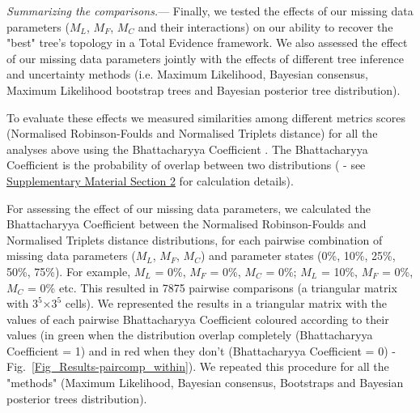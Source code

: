 \documentclass[12pt,letterpaper]{article}
\renewcommand{\subsubsection}[1]{%
\vspace{2ex}
\noindent
\textit{#1.}---}
\begin{document}
\subsubsection{Summarizing the comparisons}
Finally, we tested the effects of our missing data parameters ($M_{L}$, $M_{F}$, $M_{C}$ and their interactions) on our ability to recover the "best" tree's topology in a Total Evidence framework. We also assessed the effect of our missing data parameters jointly with the effects of different tree inference and uncertainty methods (i.e. Maximum Likelihood, Bayesian consensus, Maximum Likelihood bootstrap trees and Bayesian posterior tree distribution).

To evaluate these effects we measured similarities among different metrics scores (Normalised Robinson-Foulds and Normalised Triplets distance) for all the analyses above using the Bhattacharyya Coefficient \citep{Bhattacharyya}. The Bhattacharyya Coefficient is the probability of overlap between two distributions (\citealt{Bhattacharyya} - see \hyperref[SupplementaryMaterial]{Supplementary Material Section 2} for calculation details).

For assessing the effect of our missing data parameters, we calculated the Bhattacharyya Coefficient between the Normalised Robinson-Foulds and Normalised Triplets distance distributions, for each pairwise combination of missing data parameters ($M_{L}$, $M_{F}$, $M_{C}$) and parameter states (0\%, 10\%, 25\%, 50\%, 75\%). For example, $M_{L}$ = 0\%, $M_{F}$ = 0\%, $M_{C}$ = 0\%; $M_{L}$ = 10\%, $M_{F}$ = 0\%, $M_{C}$ = 0\% etc. This resulted in 7875 pairwise comparisons (a triangular matrix with $3^5$$\times$$3^5$ cells). We represented the results in a triangular matrix with the values of each pairwise Bhattacharyya Coefficient coloured according to their values (in green when the distribution overlap completely (Bhattacharyya Coefficient = 1) and in red when they don't (Bhattacharyya Coefficient = 0) - Fig.~\ref{Fig_Results-paircomp_within}). We repeated this procedure for all the "methods" (Maximum Likelihood, Bayesian consensus, Bootstraps and Bayesian posterior trees distribution).
\end{document}
